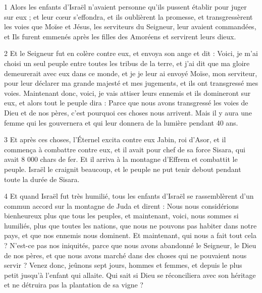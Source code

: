\par 1 Alors les enfants d'Israël n'avaient personne qu'ils pussent établir pour juger sur eux ; et leur cœur s'effondra, et ils oublièrent la promesse, et transgressèrent les voies que Moïse et Jésus, les serviteurs du Seigneur, leur avaient commandées, et Ils furent emmenés après les filles des Amoréens et servirent leurs dieux.

\par 2 Et le Seigneur fut en colère contre eux, et envoya son ange et dit : Voici, je m'ai choisi un seul peuple entre toutes les tribus de la terre, et j'ai dit que ma gloire demeurerait avec eux dans ce monde, et je je leur ai envoyé Moïse, mon serviteur, pour leur déclarer ma grande majesté et mes jugements, et ils ont transgressé mes voies. Maintenant donc, voici, je vais attiser leurs ennemis et ils domineront sur eux, et alors tout le peuple dira : Parce que nous avons transgressé les voies de Dieu et de nos pères, c'est pourquoi ces choses nous arrivent. Mais il y aura une femme qui les gouvernera et qui leur donnera de la lumière pendant 40 ans.

\par 3 Et après ces choses, l'Éternel excita contre eux Jabin, roi d'Asor, et il commença à combattre contre eux, et il avait pour chef de sa force Sisara, qui avait 8 000 chars de fer. Et il arriva à la montagne d'Effrem et combattit le peuple. Israël le craignit beaucoup, et le peuple ne put tenir debout pendant toute la durée de Sisara.

\par 4 Et quand Israël fut très humilié, tous les enfants d'Israël se rassemblèrent d'un commun accord sur la montagne de Juda et dirent : Nous nous considérions bienheureux plus que tous les peuples, et maintenant, voici, nous sommes si humiliés, plus que toutes les nations, que nous ne pouvons pas habiter dans notre pays, et que nos ennemis nous dominent. Et maintenant, qui nous a fait tout cela ? N'est-ce pas nos iniquités, parce que nous avons abandonné le Seigneur, le Dieu de nos pères, et que nous avons marché dans des choses qui ne pouvaient nous servir ? Venez donc, jeûnons sept jours, hommes et femmes, et depuis le plus petit jusqu'à l'enfant qui allaite. Qui sait si Dieu se réconciliera avec son héritage et ne détruira pas la plantation de sa vigne ?

